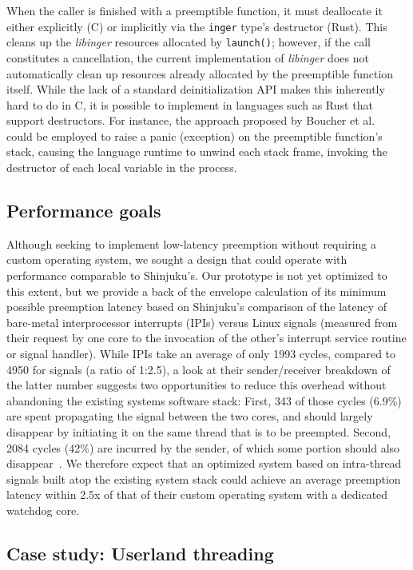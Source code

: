 When the caller is finished with a preemptible function, it must deallocate it
either explicitly (C) or implicitly via the \texttt{inger} type's destructor
(Rust).  This cleans up the \textit{libinger} resources allocated by
\texttt{launch()};
however, if the call constitutes a cancellation, the current implementation of
\textit{libinger} does not automatically clean up resources already allocated by the
preemptible function itself.  While the lack of a standard deinitialization API
makes this inherently hard to do in C, it is possible to implement in languages
such as Rust that support destructors.  For instance, the approach proposed by
Boucher et al.~\cite{boucher:atc2018} could be employed to raise a panic
(exception) on the preemptible function's stack, causing the language runtime
to unwind each stack frame, invoking the destructor of each local variable in
the process.


\subsection{Performance goals}

Although seeking to implement low-latency preemption without requiring a custom
operating system, we sought a design that could operate with performance
comparable to Shinjuku's.  Our prototype is not yet optimized to this extent,
but we provide a back of the envelope calculation of its minimum possible
preemption latency based on Shinjuku's comparison of the latency of bare-metal
interprocessor interrupts (IPIs) versus Linux signals (measured from their
request by one core to the invocation of the other's interrupt service routine
or signal handler).  While IPIs take an average of only 1993 cycles, compared
to 4950 for signals (a ratio of 1:2.5), a look at their sender/receiver
breakdown of the latter number suggests two opportunities to reduce this
overhead without abandoning the existing systems software stack:  First, 343 of
those cycles (6.9\%) are spent propagating the signal between the two cores,
and should largely disappear by initiating it on the same thread that is to be
preempted.  Second, 2084 cycles (42\%) are incurred by the sender, of which
some portion should also disappear~\cite{Kaffes:nsdi2019}.  We therefore expect
that an optimized system based on intra-thread signals built atop the existing
system stack could achieve an average preemption latency within 2.5x of that of
their custom operating system with a dedicated watchdog core.


\subsection{Case study: Userland threading}
\label{sec:threading}
